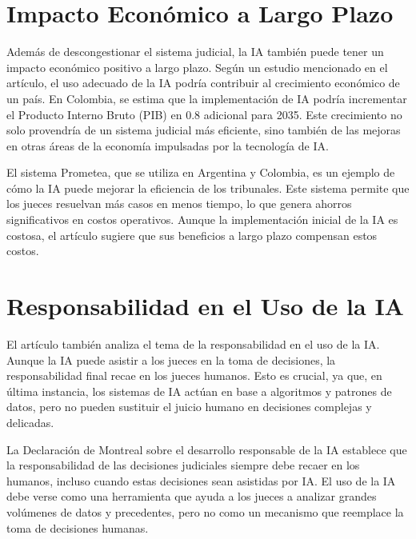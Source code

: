 \documentclass[runningheads]{llncs}
\begin{document}
\section{ Impacto Económico a Largo Plazo }
Además de descongestionar el sistema judicial, la IA también puede tener un impacto económico positivo a largo plazo. Según un estudio mencionado en el artículo, el uso adecuado de la IA podría contribuir al crecimiento económico de un país. En Colombia, se estima que la implementación de IA podría incrementar el Producto Interno Bruto (PIB) en 0.8 adicional para 2035. Este crecimiento no solo provendría de un sistema judicial más eficiente, sino también de las mejoras en otras áreas de la economía impulsadas por la tecnología de IA.

El sistema Prometea, que se utiliza en Argentina y Colombia, es un ejemplo de cómo la IA puede mejorar la eficiencia de los tribunales. Este sistema permite que los jueces resuelvan más casos en menos tiempo, lo que genera ahorros significativos en costos operativos. Aunque la implementación inicial de la IA es costosa, el artículo sugiere que sus beneficios a largo plazo compensan estos costos.
\section{Responsabilidad en el Uso de la IA}
El artículo también analiza el tema de la responsabilidad en el uso de la IA. Aunque la IA puede asistir a los jueces en la toma de decisiones, la responsabilidad final recae en los jueces humanos. Esto es crucial, ya que, en última instancia, los sistemas de IA actúan en base a algoritmos y patrones de datos, pero no pueden sustituir el juicio humano en decisiones complejas y delicadas.

La Declaración de Montreal sobre el desarrollo responsable de la IA establece que la responsabilidad de las decisiones judiciales siempre debe recaer en los humanos, incluso cuando estas decisiones sean asistidas por IA. El uso de la IA debe verse como una herramienta que ayuda a los jueces a analizar grandes volúmenes de datos y precedentes, pero no como un mecanismo que reemplace la toma de decisiones humanas.
\end{document}
